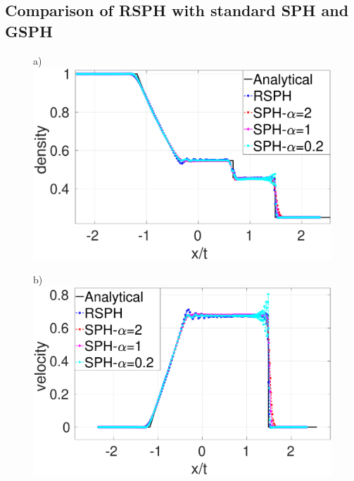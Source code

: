\subsection{Comparison of RSPH with standard SPH and GSPH}
\begin{figure}
    \centering
    \begin{minipage}{.495\textwidth}
        \centering a)
        \includegraphics[width=0.99 \textwidth,height=0.7\textwidth]{./Chapter-4/Figures/Sod/RCM-Sod-SPH-alf-rho}
    \end{minipage}%
    \begin{minipage}{.495 \textwidth}
        \centering b)
        \includegraphics[width=0.99 \textwidth,height=0.7\textwidth]{./Chapter-4/Figures/Sod/RCM-Sod-SPH-alf-v}
    \end{minipage}%
    \\

\end{figure}
